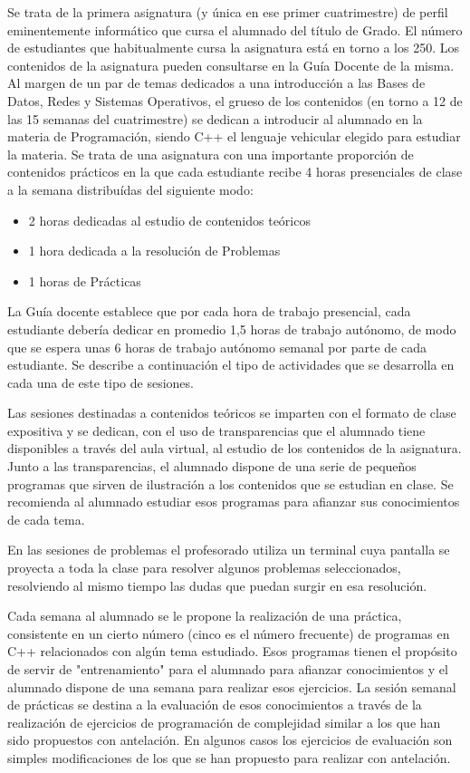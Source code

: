 \documentclass[twocolumn,twoside,a4paper, 10pt]{article}
\begin{document}
Se trata de la primera asignatura (y única en ese primer cuatrimestre) de perfil eminentemente informático que
cursa el alumnado del título de Grado.
El número de estudiantes que habitualmente cursa la asignatura está en torno a los 250. 
Los contenidos de la asignatura pueden consultarse en la Guía Docente \cite{ULL:2022:GD} de la misma.
Al margen de un par de temas dedicados a una introducción a las Bases de Datos, Redes y Sistemas Operativos,
el grueso de los contenidos (en torno a 12 de las 15 semanas del cuatrimestre) se dedican a introducir al
alumnado en la materia de Programación, siendo C++ el lenguaje vehicular elegido para estudiar la materia.
Se trata de una asignatura con una importante proporción de contenidos prácticos en la que cada estudiante
recibe 4 horas presenciales de clase a la semana distribuídas del siguiente modo:
\begin{itemize}
  \item 2 horas dedicadas al estudio de contenidos teóricos
  \item 1 hora dedicada a la resolución de Problemas
  \item 1 horas de Prácticas
\end{itemize}
La Guía docente establece que por cada hora de trabajo presencial, cada estudiante debería dedicar en 
promedio 1,5 horas de trabajo autónomo, de modo que se espera unas 6 horas de trabajo autónomo semanal por 
parte de cada estudiante. 
Se describe a continuación el tipo de actividades que se desarrolla en cada una de este tipo de sesiones.

Las sesiones destinadas a contenidos teóricos se imparten con el formato de clase expositiva y se dedican, 
con el uso de transparencias que el alumnado tiene disponibles a través del aula virtual, al estudio de los 
contenidos de la asignatura. 
Junto a las transparencias, el alumnado dispone de una serie de pequeños programas que sirven de ilustración a
los contenidos que se estudian en clase. 
Se recomienda al alumnado estudiar esos programas para afianzar sus conocimientos de cada tema.

En las sesiones de problemas el profesorado utiliza un terminal cuya pantalla se proyecta a toda la clase para
resolver algunos problemas seleccionados, resolviendo al mismo tiempo las dudas que puedan surgir en esa
resolución. 

Cada semana al alumnado se le propone la realización de una práctica, consistente en un cierto número (cinco
es el número frecuente) de programas en C++ relacionados con algún tema estudiado.
Esos programas tienen el propósito de servir de "entrenamiento" para el alumnado para afianzar conocimientos y
el alumnado dispone de una semana para realizar esos ejercicios.
La sesión semanal de prácticas se destina a la evaluación de esos conocimientos a través de la realización de
ejercicios de programación de complejidad similar a los que han sido propuestos con antelación.
En algunos casos los ejercicios de evaluación son simples modificaciones de los que se han propuesto para
realizar con antelación.
\end{document}
